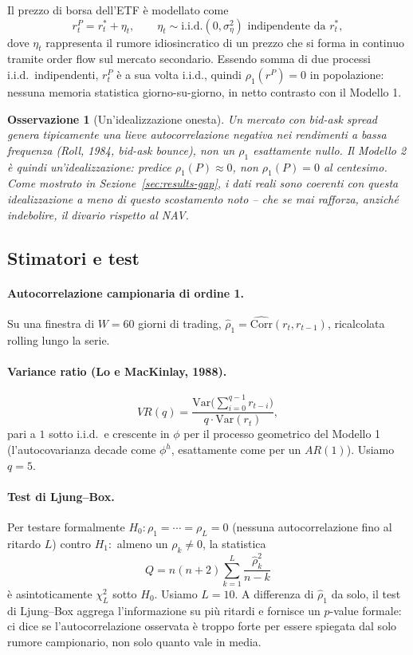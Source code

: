 \documentclass[11pt]{article}
\newtheorem{remark}{Osservazione}
\begin{document}
Il prezzo di borsa dell'ETF \`e modellato come
\[
r^{P}_t = r^\ast_t + \eta_t, \qquad \eta_t \sim \text{i.i.d.}(0,\sigma_\eta^2) \text{ indipendente da } r^\ast_t,
\]
dove $\eta_t$ rappresenta il rumore idiosincratico di un prezzo che si forma in continuo tramite order flow sul mercato secondario. Essendo somma di due processi i.i.d.\ indipendenti, $r^P_t$ \`e a sua volta i.i.d., quindi $\rho_1(r^P) = 0$ in popolazione: nessuna memoria statistica giorno-su-giorno, in netto contrasto con il Modello 1.

\begin{remark}[Un'idealizzazione onesta]
Un mercato con bid-ask spread genera tipicamente una lieve autocorrelazione \emph{negativa} nei rendimenti a bassa frequenza (Roll, 1984, bid-ask bounce), non un $\rho_1$ esattamente nullo. Il Modello 2 \`e quindi un'idealizzazione: predice $\rho_1(P)\approx 0$, non $\rho_1(P)=0$ al centesimo. Come mostrato in Sezione~\ref{sec:results-gap}, i dati reali sono coerenti con questa idealizzazione a meno di questo scostamento noto -- che se mai rafforza, anzich\'e indebolire, il divario rispetto al NAV.
\end{remark}

\subsection{Stimatori e test}
\label{sec:estimators}

\paragraph{Autocorrelazione campionaria di ordine 1.} Su una finestra di $W=60$ giorni di trading, $\hat\rho_1 = \widehat{\mathrm{Corr}}(r_t, r_{t-1})$, ricalcolata rolling lungo la serie.

\paragraph{Variance ratio (Lo e MacKinlay, 1988).}
\[
VR(q) = \frac{\mathrm{Var}\big(\sum_{i=0}^{q-1} r_{t-i}\big)}{q\cdot\mathrm{Var}(r_t)},
\]
pari a $1$ sotto i.i.d.\ e crescente in $\phi$ per il processo geometrico del Modello 1 (l'autocovarianza decade come $\phi^h$, esattamente come per un $AR(1)$). Usiamo $q=5$.

\paragraph{Test di Ljung--Box.} Per testare formalmente $H_0: \rho_1=\cdots=\rho_L=0$ (nessuna autocorrelazione fino al ritardo $L$) contro $H_1:$ almeno un $\rho_k\ne 0$, la statistica
\[
Q = n(n+2)\sum_{k=1}^{L}\frac{\hat\rho_k^2}{n-k}
\]
\`e asintoticamente $\chi^2_L$ sotto $H_0$. Usiamo $L=10$. A differenza di $\hat\rho_1$ da solo, il test di Ljung--Box aggrega l'informazione su pi\`u ritardi e fornisce un $p$-value formale: ci dice se l'autocorrelazione osservata \`e troppo forte per essere spiegata dal solo rumore campionario, non solo quanto vale in media.
\end{document}
